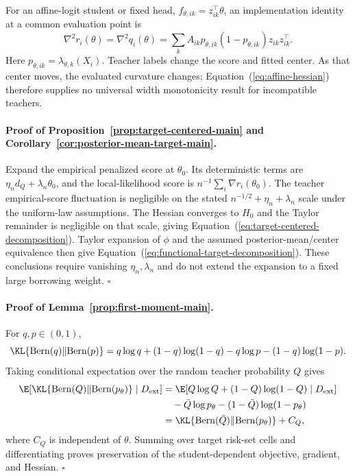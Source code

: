 \documentclass{article} %
\renewcommand{\eqref}[1]{\textup{(\ref{#1})}}
\begin{document}
For an affine-logit student or fixed head, $f_{\theta,ik}=z_{ik}^\top\theta$, an implementation identity at a common evaluation point is
\begin{equation}
\nabla^2r_i(\theta)=\nabla^2q_i(\theta)
=\sum_kA_{ik}p_{\theta,ik}(1-p_{\theta,ik})z_{ik}z_{ik}^\top.
\label{eq:affine-hessian}
\end{equation}
Here $p_{\theta,ik}=\lambda_{\theta,k}(X_i)$. Teacher labels change the score and fitted center. As that center moves, the evaluated curvature changes; Equation~\eqref{eq:affine-hessian} therefore supplies no universal width monotonicity result for incompatible teachers.

\paragraph{Proof of Proposition~\ref{prop:target-centered-main} and Corollary~\ref{cor:posterior-mean-target-main}.}
Expand the empirical penalized score at $\theta_0$. Its deterministic terms are $\eta_nd_Q+\lambda_n\theta_0$, and the local-likelihood score is $n^{-1}\sum_i\nabla r_i(\theta_0)$. The teacher empirical-score fluctuation is negligible on the stated $n^{-1/2}+\eta_n+\lambda_n$ scale under the uniform-law assumptions. The Hessian converges to $H_0$ and the Taylor remainder is negligible on that scale, giving Equation~\eqref{eq:target-centered-decomposition}. Taylor expansion of $\phi$ and the assumed posterior-mean/center equivalence then give Equation~\eqref{eq:functional-target-decomposition}. These conclusions require vanishing $\eta_n,\lambda_n$ and do not extend the expansion to a fixed large borrowing weight. \hfill$\square$




\paragraph{Proof of Lemma~\ref{prop:first-moment-main}.}
For $q,p\in(0,1)$,
\[
\KL\{\mathrm{Bern}(q)\Vert\mathrm{Bern}(p)\}
=q\log q+(1-q)\log(1-q)-q\log p-(1-q)\log(1-p).
\]
Taking conditional expectation over the random teacher probability $Q$ gives
\begin{align*}
\E[\KL\{\mathrm{Bern}(Q)\Vert\mathrm{Bern}(p_\theta)\}\mid D_{\rm ext}]
&=\E[Q\log Q+(1-Q)\log(1-Q)\mid D_{\rm ext}]\\
&\quad-\bar Q\log p_\theta-(1-\bar Q)\log(1-p_\theta)\\
&=\KL\{\mathrm{Bern}(\bar Q)\Vert\mathrm{Bern}(p_\theta)\}+C_Q,
\end{align*}
where $C_Q$ is independent of $\theta$. Summing over target risk-set cells and differentiating proves preservation of the student-dependent objective, gradient, and Hessian. \hfill$\square$
\end{document}
